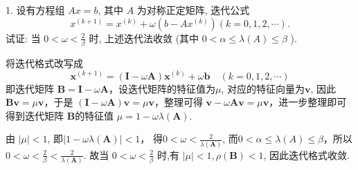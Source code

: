 \begin{tcolorbox}[breakable,
		colframe=white!10!jingga, coltitle=white!90!jingga, colback=white!95!jingga, coltext=black, colbacktitle=white!10!jingga, enhanced, fonttitle=\bfseries,fontupper=\normalsize, attach boxed title to top left={yshift=-2mm}, before skip=8pt, after skip=8pt,
		title=解答题]

1. 设有方程组 $ A x=b $, 其中 $ A $ 为对称正定矩阵, 迭代公式
$$
x^{(k+1)}=x^{(k)}+\omega\left(b-A x^{(k)}\right)(k=0,1,2, \cdots) .
$$
试证: 当 $ 0<\omega<\frac{2}{\beta} $ 时, 上述迭代法收敛
 (其中  $0<\alpha \leqslant \lambda(A) \leqslant \beta$  ). 
\tcblower

将迭代格式改写成
$$
\boldsymbol{x}^{(k+1)}=(\boldsymbol{I}-\omega \boldsymbol{A}) \boldsymbol{x}^{(k)}+\omega \boldsymbol{b} \quad(k=0,1,2, \cdots)
$$
即迭代矩阵 $ \boldsymbol{B}=\boldsymbol{I}-\omega \boldsymbol{A} $，设迭代矩阵的特征值为$\mu$, 对应的特征向量为$\boldsymbol{v}$, 因此 $ \boldsymbol{Bv} = \mu \boldsymbol{v} $，于是 $ (\boldsymbol{I}-\omega \boldsymbol{A})\boldsymbol{v} = \mu \boldsymbol{v} $，整理可得 $ \boldsymbol{v} - \omega \boldsymbol{A}\boldsymbol{v} = \mu \boldsymbol{v} $，进一步整理即可得到迭代矩阵 $ \boldsymbol{B}$的特征值 $ \mu = 1 - \omega \lambda(\boldsymbol{A}) $.

由 $ |\mu|<1$, 即$|1-{\omega \lambda}(\boldsymbol{A})|<1 $， 得$0<\omega<\frac{2}{\lambda(\boldsymbol{A})}$,
而$0<\alpha \leq \lambda(A) \leq \beta$，所以$ 0<\omega<\frac{2}{\beta}<\frac{2}{\lambda(\boldsymbol{A})}$.
故当 $0<\omega<\frac{2}{\beta} $ 时,有 $|\mu|<1, \rho(\boldsymbol{B})<1 $, 因此迭代格式收敛.

\end{tcolorbox}



